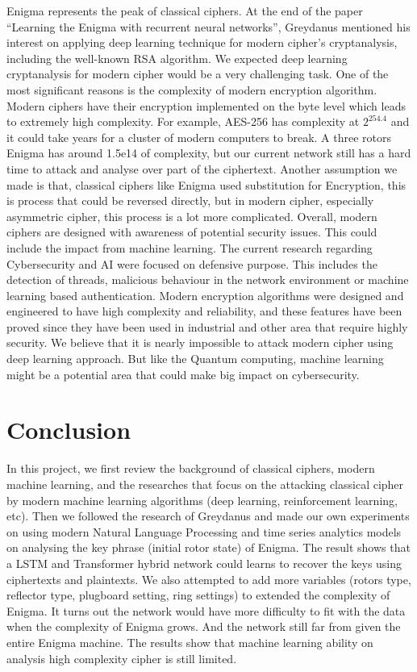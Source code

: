 Enigma represents the peak of classical ciphers. At the end of the paper “Learning the Enigma with recurrent neural networks”, Greydanus \cite{greydanus2017learning} mentioned his interest on applying deep learning technique for modern cipher’s cryptanalysis, including the well-known RSA algorithm. We expected deep learning cryptanalysis for modern cipher would be a very challenging task. One of the most significant reasons is the complexity of modern encryption algorithm. Modern ciphers have their encryption implemented on the byte level which leads to extremely high complexity. For example, AES-256 has complexity at \(2^\text{254.4}\) and it could take years for a cluster of modern computers to break. A three rotors Enigma has around 1.5e14 of complexity, but our current network still has a hard time to attack and analyse over part of the ciphertext. Another assumption we made is that, classical ciphers like Enigma used substitution for Encryption, this is process that could be reversed directly, but in modern cipher, especially asymmetric cipher, this process is a lot more complicated. Overall, modern ciphers are designed with awareness of potential security issues. This could include the impact from machine learning. The current research regarding Cybersecurity and AI were focused on defensive purpose. This includes the detection of threads, malicious behaviour in the network environment or machine learning based authentication. Modern encryption algorithms were designed and engineered to have high complexity and reliability, and these features have been proved since they have been used in industrial and other area that require highly security. We believe that it is nearly impossible to attack modern cipher using deep learning approach. But like the Quantum computing, machine learning might be a potential area that could make big impact on cybersecurity.

\section{Conclusion}
In this project, we first review the background of classical ciphers, modern machine learning, and the researches that focus on the attacking classical cipher by modern machine learning algorithms (deep learning, reinforcement learning, etc). Then we followed the research of Greydanus \cite{greydanus2017learning} and made our own experiments on using modern Natural Language Processing and time series analytics models on analysing the key phrase (initial rotor state) of Enigma. The result shows that a LSTM and Transformer hybrid network could learns to recover the keys using ciphertexts and plaintexts. We also attempted to add more variables (rotors type, reflector type, plugboard setting, ring settings) to extended the complexity of Enigma. It turns out the network would have more difficulty to fit with the data when the complexity of Enigma grows. And the network still far from given the entire Enigma machine. The results show that machine learning ability on analysis high complexity cipher is still limited. 

